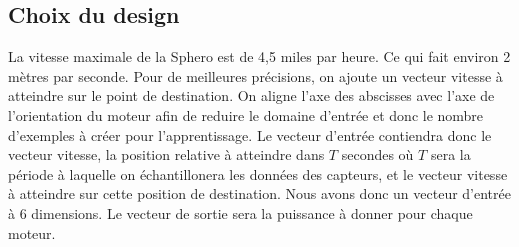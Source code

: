 \subsection{Choix du design}

La vitesse maximale de la Sphero est de 4,5 miles par heure\cite{product}.
Ce qui fait environ 2 mètres par seconde.
Pour de meilleures précisions, on ajoute un vecteur vitesse à atteindre sur le point de destination.
On aligne l'axe des abscisses avec l'axe de l'orientation du moteur afin de reduire le domaine d'entrée et donc le nombre d'exemples à créer pour l'apprentissage.
Le vecteur d'entrée contiendra donc le vecteur vitesse, la position relative à atteindre dans $T$ secondes où $T$ sera la période à laquelle on échantillonera les données des capteurs, et le vecteur vitesse à atteindre sur cette position de destination.
Nous avons donc un vecteur d'entrée à 6 dimensions.
Le vecteur de sortie sera la puissance à donner pour chaque moteur.